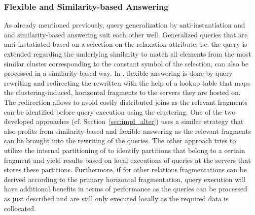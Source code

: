 \subsubsection{Flexible and Similarity-based Answering}
\label{sec:meth_fqa_fqsba}

As already mentioned previously, query generalization by anti-instantiation and and similarity-based answering suit each other well. Generalized queries
that are anti-instatiated based on a selection on the relaxation attribute, i.e. the query is extended regarding the underlying similarity to match all
elements from the most similar cluster corresponding to the constant symbol of the selection, can also be processed in a similarity-based way. In
\cite{Wiese2014}, flexible answering is done by query rewriting and redirecting the rewritten with the help of a lookup table that maps the 
clustering-induced, horizontal fragments to the servers they are hosted on. The redirection allows to avoid costly distributed joins as the relevant
fragments can be identified before query execution using the clustering. One of the two developed approaches (cf. Section~\ref{sec:impl_alter}) uses a
similar strategy that also profits from similarity-based and flexible answering as the relevant fragments can be brought into the rewriting of the queries.
The other approach tries to utilize the internal partitioning of  to identify partitions that belong to a certain fragment and yield
results based on local executions of queries at the servers that stores these partitions.
Furthermore, if for other relations fragmentations can be derived according to the primary horizontal fragmentation, query execution will have additional 
benefits in terms of performance as the queries can be processed as just described and are still only executed locally as the required data is collocated.


